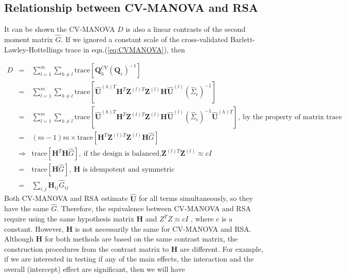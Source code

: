 \subsection{Relationship between CV-MANOVA and RSA}

It can be shown the CV-MANOVA $D$ is also a linear contrasts of the
second moment matrix $\hat{G}$. If we ignored a constant scale of
the cross-validated Barlett-Lawley-Hottellings trace in eqn.(\ref{eq:CVMANOVA}),
then

\begin{eqnarray*}
D & = & \sum_{l=1}^{m}\sum_{h\neq l}\text{trace}\left[\boldsymbol{Q}_{h}^{CV}\left(\boldsymbol{Q}_{e}\right)^{-1}\right]\\
 & = & \sum_{l=1}^{m}\sum_{h\neq l}\text{trace}\left[\hat{\boldsymbol{U}}^{(h)T}\boldsymbol{H}^{T}\boldsymbol{Z}^{(l)T}\boldsymbol{Z}^{(l)}\boldsymbol{H}\hat{\boldsymbol{U}}^{(l)}\left(\hat{\Sigma}_{\epsilon}\right)^{-1}\right]\\
 & = & \sum_{l=1}^{m}\sum_{h\neq l}\text{trace}\left[\hat{\boldsymbol{U}}^{(h)T}\boldsymbol{H}^{T}\boldsymbol{Z}^{(l)T}\boldsymbol{Z}^{(l)}\boldsymbol{H}\hat{\boldsymbol{U}}^{(l)}\left(\hat{\Sigma}_{\epsilon}\right)^{-1}\hat{\boldsymbol{U}}^{(h)T}\right],\ \text{by the property of matrix trace}\\
 & = & (m-1)m\times\text{trace}\left[\boldsymbol{H}^{T}\boldsymbol{Z}^{(l)T}\boldsymbol{Z}^{(l)}\boldsymbol{H}\hat{G}\right]\\
 & \Rightarrow & \text{trace}\left[\boldsymbol{H}^{T}\boldsymbol{H}\hat{G}\right],\ \text{if the design is balanced,}\boldsymbol{Z}^{(l)T}\boldsymbol{Z}^{(l)}\approx cI\\
 & = & \text{trace}\left[\boldsymbol{H}\hat{G}\right],\ \boldsymbol{H}\text{ is idempotent and symmetric}\\
 & = & \sum_{i,j}\boldsymbol{H}_{ij}\hat{G}_{ij}
\end{eqnarray*}
Both CV-MANOVA and RSA estimate $\hat{\boldsymbol{U}}$ for all terms
simultaneously, so they have the same $\hat{G}$. Therefore, the equivalence
between CV-MANOVA and RSA require using the same hypothesis matrix
$\boldsymbol{H}$ and $Z^{T}Z\approx cI$ , where $c$ is a constant.
However, $\boldsymbol{H}$ is not necessarily the same for CV-MANOVA
and RSA. Although $\boldsymbol{H}$ for both methods are based on
the same contrast matrix, the construction procedures from the contrast
matrix to $\boldsymbol{H}$ are different. For example, if we are
interested in testing if any of the main effects, the interaction
and the overall (intercept) effect are significant, then we will have
